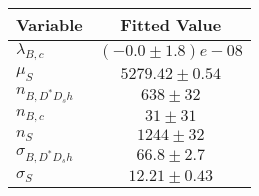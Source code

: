 \begin{tabular}[t]{lc}
\hline
Variable &Fitted Value\\
\hline\hline
$\lambda_{B,c}$&$(-0.0\pm1.8)e-08$\\
\hline
$\mu_S$&$5279.42\pm0.54$\\
\hline
$n_{B, D^* D_s h}$&$638\pm32$\\
\hline
$n_{B,c}$&$31\pm31$\\
\hline
$n_S$&$1244\pm32$\\
\hline
$\sigma_{B, D^* D_s h}$&$66.8\pm2.7$\\
\hline
$\sigma_S$&$12.21\pm0.43$\\
\hline
\end{tabular}